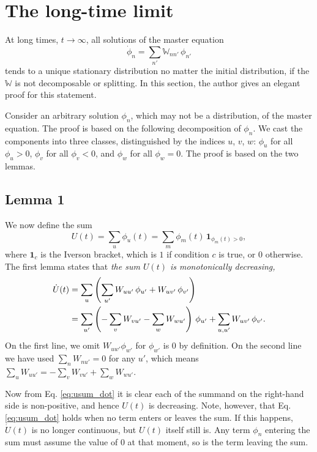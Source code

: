 \documentclass{book}
\numberwithin{equation}{section}
\theoremstyle{plain}
\theoremstyle{definition}
\theoremstyle{remark}
\theoremstyle{BoldStyle}
\numberwithin{exercise}{section}
\begin{document}
\section{The long-time limit}



At long times, $t \to \infty$,
all solutions of the master equation
$$
\dot \phi_n = \sum_{n'} \mathbb W_{n n'} \, \phi_{n'}
$$
tends to a unique stationary distribution
no matter the initial distribution,
if the $\mathbb W$ is not decomposable
or splitting.
%
In this section, the author gives
an elegant proof for this statement.
%



Consider an arbitrary solution $\phi_n$,
which may not be a distribution,
of the master equation.
%
The proof is based on the following
decomposition of $\phi_n$.
%
We cast the components into three classes,
distinguished by the indices $u$, $v$, $w$:
$\phi_u$ for all $\phi_u > 0$,
$\phi_v$ for all $\phi_v < 0$,
and
$\phi_w$ for all $\phi_w = 0$.
The proof is based on the two lemmas.


\subsection{Lemma 1}


We now define the sum
%
\begin{equation}
  U(t) = \sum_u \phi_u(t)
  = \sum_m \phi_m(t) \, \mathbf 1_{\phi_m(t) > 0},
  \label{eq:phi_usum}
\end{equation}
%
where $\mathbf 1_c$ is the Iverson bracket,
which is $1$ if condition $c$ is true,
or $0$ otherwise.
%
The first lemma states that
\emph{
  the sum $U(t)$ is monotonically decreasing,
}
%
\begin{align}
  \dot U(t)
  &=
  \sum_u
  \left(
    \sum_{u'}
      W_{u u'} \, \phi_{u'}
      + W_{u v'} \, \phi_{v'}
  \right)
  \notag \\
  &=
  \sum_{u'}
  \left(
  -
  \sum_{v}
    W_{v u'}
  -
  \sum_{w}
    W_{w u'}
  \right)
  \, \phi_{u'}
  +
  \sum_{u, u'}
    W_{u v'} \, \phi_{v'}.
  \label{eq:usum_dot}
\end{align}
%
On the first line, we omit $W_{uw'} \phi_{w'}$
for $\phi_{w'}$ is $0$ by definition.
%
On the second line we have used $\sum_n W_{n u'} = 0$
for any $u'$, which means
$\sum_u W_{u u'} = -\sum_v W_{v u'} + \sum_w W_{w u'}$.


Now from Eq. \eqref{eq:usum_dot}
it is clear each of the summand on the right-hand side
is non-positive, and hence $U(t)$ is decreasing.
%
Note, however, that Eq. \eqref{eq:usum_dot}
holds when no term enters or leaves the sum.
%
If this happens, $\dot U(t)$ is no longer continuous,
but $U(t)$ itself still is.
%
Any term $\phi_n$ entering the sum must assume
the value of $0$ at that moment,
so is the term leaving the sum.
\end{document}
